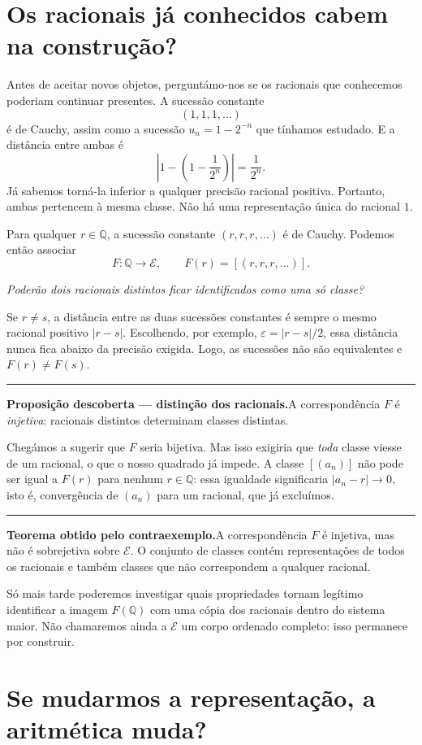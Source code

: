 \documentclass[11pt,a4paper]{article}
\newcommand{\Q}{\mathbb{Q}}
\newcommand{\questao}[1]{\par\medskip\noindent\textit{#1}\par\smallskip}
\newcommand{\assentado}[2]{%
\par\medskip\noindent\begingroup\color{azul}\rule{\linewidth}{0.45pt}\par\smallskip
\noindent\textbf{#1.}\enspace #2\par\endgroup\medskip}
\begin{document}
\section{Os racionais já conhecidos cabem na construção?}

Antes de aceitar novos objetos, perguntámo-nos se os racionais que conhecemos poderiam continuar presentes. A sucessão constante
\[
 (1,1,1,\ldots)
\]
é de Cauchy, assim como a sucessão $u_n=1-2^{-n}$ que tínhamos estudado. E a distância entre ambas é
\[
 \left|1-\left(1-\frac1{2^n}\right)\right|=\frac1{2^n}.
\]
Já sabemos torná-la inferior a qualquer precisão racional positiva. Portanto, ambas pertencem à mesma classe. Não há uma representação única do racional $1$.

Para qualquer $r\in\Q$, a sucessão constante $(r,r,r,\ldots)$ é de Cauchy. Podemos então associar
\[
 F:\Q\longrightarrow\mathcal E,
 \qquad F(r)=[(r,r,r,\ldots)].
\]

\questao{Poderão dois racionais distintos ficar identificados como uma só classe?}

Se $r\ne s$, a distância entre as duas sucessões constantes é sempre o mesmo racional positivo $|r-s|$. Escolhendo, por exemplo, $\varepsilon=|r-s|/2$, essa distância nunca fica abaixo da precisão exigida. Logo, as sucessões não são equivalentes e $F(r)\ne F(s)$.

\assentado{Proposição descoberta --- distinção dos racionais}{A correspondência $F$ é \emph{injetiva}: racionais distintos determinam classes distintas.}

Chegámos a sugerir que $F$ seria bijetiva. Mas isso exigiria que \emph{toda} classe viesse de um racional, o que o nosso quadrado já impede. A classe $[(a_n)]$ não pode ser igual a $F(r)$ para nenhum $r\in\Q$: essa igualdade significaria $|a_n-r|\to0$, isto é, convergência de $(a_n)$ para um racional, que já excluímos.

\assentado{Teorema obtido pelo contraexemplo}{A correspondência $F$ é injetiva, mas não é sobrejetiva sobre $\mathcal E$. O conjunto de classes contém representações de todos os racionais e também classes que não correspondem a qualquer racional.}

Só mais tarde poderemos investigar quais propriedades tornam legítimo identificar a imagem $F(\Q)$ com uma cópia dos racionais dentro do sistema maior. Não chamaremos ainda a $\mathcal E$ um corpo ordenado completo: isso permanece por construir.

\section{Se mudarmos a representação, a aritmética muda?}
\end{document}
